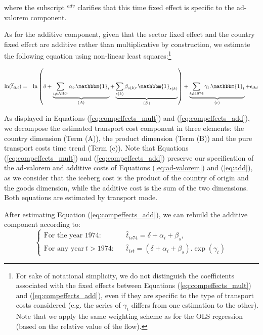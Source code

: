 \documentclass[a4paper,11pt]{article}
\begin{document}
\noindent where the subscript $^{adv}$ clarifies that this time fixed effect is specific to the ad-valorem component. \medskip


As for the additive component, given that the sector fixed effect and the country fixed effect are additive rather than multiplicative by construction, we estimate the following equation using non-linear least squares:\footnote{For sake of notational simplicity, we do not distinguish the coefficients associated with the fixed effects between Equations (\ref{eq:compeffects_mult}) and (\ref{eq:compeffects_add}), even if they are specific to the type of transport costs considered (e.g. the series of $\gamma_t$ differs from one estimation to the other).
Note that we apply the same weighting scheme as for the OLS regression (based on the relative value of the flow).}

\begin{eqnarray}
\ln(\widehat{t}_{ikt})&=&\ln\left( \delta + \underbrace{\sum_{i \neq \text{ARG}}  \alpha_i.\mathbbm{1}_i}_{(A)}+\underbrace{\sum_{s(k)}\beta_{s(k)}.\mathbbm{1}_{s(k)}}_{(B)}\right) + \underbrace{\sum_{t \neq 1974}\gamma_t.\mathbbm{1}_t}_{(c)}+\epsilon_{ikt} \label{eq:compeffects_add}
\end{eqnarray}



As displayed in Equations (\ref{eq:compeffects_mult}) and (\ref{eq:compeffects_add}), we decompose the estimated transport cost component in three elements: the country dimension (Term (A)), the product dimension (Term (B)) and the pure transport costs time trend (Term (c)).
Note that Equations (\ref{eq:compeffects_mult}) and (\ref{eq:compeffects_add}) preserve our specification of the ad-valorem and additive costs of Equations (\ref{eq:ad-valorem}) and (\ref{eq:add}), as we consider that the iceberg cost is the product of the country of origin and the goods dimension, while the additive cost is the sum of the two dimensions.
Both equations are estimated by transport mode.\smallskip

After estimating Equation (\ref{eq:compeffects_add}), we can rebuild the additive component according to:
\[\left\{
  \begin{array}{lcl}
\text{For the year 1974:}&&\widehat{t}_{is74}=  \delta + \alpha_i+ \beta_s, \\
\text{For any year}~t> 1974:&&\widehat{t}_{ist}=\left(\delta + \alpha_i+ \beta_s\right).\exp(\gamma_t)
\end{array}
\right.\]
\end{document}
